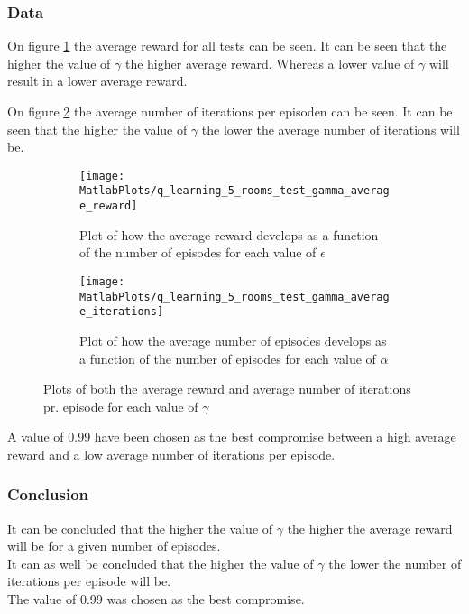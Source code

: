 \documentclass[../Head/Main.tex]{subfiles}
\begin{document}
\clearpage
\subsubsection{Data}
On figure \ref{fig:q-learn_gamma_reward} the average reward for all tests can be seen. It can be seen that the higher the value of $\gamma$ the higher average reward. Whereas a lower value of $\gamma$ will result in a lower average reward.\par
On figure \ref{fig:q-learn_gamma_iterations} the average number of iterations per episoden can be seen. It can be seen that the higher the value of $\gamma$ the lower the average number of iterations will be.
\begin{figure}[H]
	\centering
	\begin{subfigure}[b]{0.49\textwidth}
		\centering
		\texttt{[image: MatlabPlots/q\_learning\_5\_rooms\_test\_gamma\_average\_reward]}
		\caption{Plot of how the average reward develops as a function of the number of episodes for each value of $\epsilon$}
		\label{fig:q-learn_gamma_reward}
	\end{subfigure}
	\hfill
	\begin{subfigure}[b]{0.49\textwidth}
		\centering
		\texttt{[image: MatlabPlots/q\_learning\_5\_rooms\_test\_gamma\_average\_iterations]}
		\caption{Plot of how the average number of episodes develops as a function of the number of episodes for each value of $\alpha$}
		\label{fig:q-learn_gamma_iterations}
	\end{subfigure}
	\caption{Plots of both the average reward and average number of iterations pr. episode for each value of $\gamma$}
	\label{fig:q-learn_gamma}
\end{figure}
A value of 0.99 have been chosen as the best compromise between a high average reward and a low average number of iterations per episode.

\subsubsection{Conclusion}
It can be concluded that the higher the value of $\gamma$ the higher the average reward will be for a given number of episodes.\\
It can as well be concluded that the higher the value of $\gamma$ the lower the number of iterations per episode will be.\\ 
The value of 0.99 was chosen as the best compromise.
\end{document}
